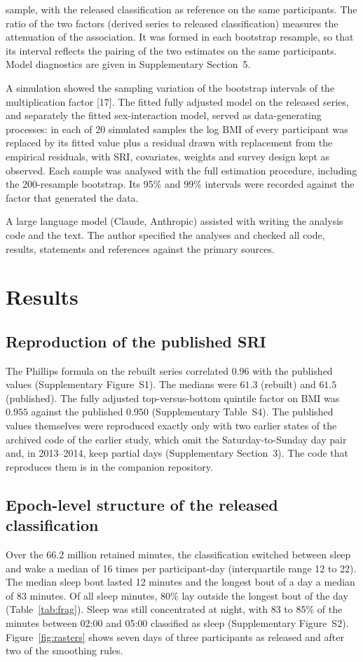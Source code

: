 \documentclass[12pt]{article}
\begin{document}
sample, with the released classification as reference on the same participants. The ratio of the two factors (derived series to released classification) measures the attenuation of the association. It was formed in each bootstrap resample, so that its interval reflects the pairing of the two estimates on the same participants. Model diagnostics are given in Supplementary Section~5.

A simulation showed the sampling variation of the bootstrap intervals of the multiplication factor [17]. The fitted fully adjusted model on the released series, and separately
the fitted sex-interaction model, served as data-generating processes: in each
of 20 simulated samples the log BMI of every participant was replaced by its
fitted value plus a residual drawn with replacement from the empirical
residuals, with SRI, covariates, weights and survey design kept as observed.
Each sample was analysed with the full estimation procedure, including the 200-resample bootstrap. Its 95\% and 99\% intervals were recorded against the factor that generated the data.

A large language model (Claude, Anthropic) assisted with writing the analysis code and the text. The author specified the analyses and checked all code, results, statements and references against the primary sources.

\section{Results}

\subsection{Reproduction of the published SRI}
\label{sec:recon}
The Phillips formula on the rebuilt series correlated $0.96$ with the published values (Supplementary Figure~S1). The medians were $61.3$ (rebuilt) and $61.5$ (published). The fully adjusted top-versus-bottom quintile factor on BMI was $0.955$ against the published $0.950$ (Supplementary Table~S4). The published values themselves were
reproduced exactly only with two earlier states of the archived code of the
earlier study, which omit the Saturday-to-Sunday day pair and, in 2013--2014,
keep partial days (Supplementary Section~3). The code that reproduces them is in the companion repository.

\subsection{Epoch-level structure of the released classification}
\label{sec:frag}
Over the 66.2 million retained minutes, the classification switched between
sleep and wake a median of 16 times per participant-day (interquartile range
12 to 22). The median sleep bout lasted 12 minutes and the longest bout of a day a median of 83 minutes. Of all sleep minutes, 80\% lay outside the longest bout of the day (Table~\ref{tab:frag}). Sleep was still concentrated at night,
with 83 to 85\% of the minutes between 02:00 and 05:00 classified as sleep
(Supplementary Figure~S2). Figure~\ref{fig:rasters} shows seven days of
three participants as released and after two of the smoothing rules.
\end{document}
